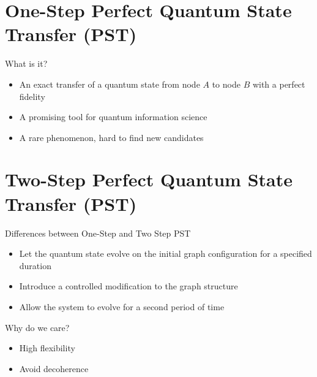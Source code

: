 \documentclass{beamer}
\begin{document}
\section{One-Step Perfect Quantum State Transfer (PST)}
\begin{frame}{What is it?}
    \begin{itemize}
        \item An exact transfer of a quantum state from node $A$ to node $B$ with a perfect fidelity
        \item A promising tool for quantum information science\footnotemark[3]
        \item A rare phenomenon, hard to find new candidates
    \end{itemize}
    \begin{center}
\end{center}
\end{frame}
\section{Two-Step Perfect Quantum State Transfer (PST)}
\begin{frame}{Differences between One-Step and Two Step PST}
    \begin{itemize}
        \item Let the quantum state evolve on the initial graph configuration for a specified duration
        \item  Introduce a controlled modification to the graph structure
        \item Allow the system to evolve for a second period of time
    \end{itemize}
\end{frame}
\begin{frame}{Why do we care?}
    \begin{itemize}
        \item High flexibility
        \item Avoid decoherence
    \end{itemize}
\end{frame}
\end{document}
